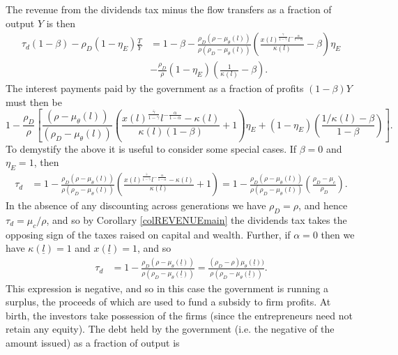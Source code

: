 \documentclass[11pt]{article}
\theoremstyle{plain}
\begin{document}
The revenue from the dividends tax minus the flow transfers as a fraction of output $Y$ is then
\begin{align*}
\tau_d(1-\beta) - \rho_D(1-\eta_E)\frac{T}{Y} & = 1 - \beta - \frac{\rho_D(\rho - \mu_{\theta}(l))}{\rho(\rho_D - \mu_{\theta}(l))}{\left( \frac{x(l)^{\frac{\overline{\gamma}}{1-\overline{\gamma}}}l^{-\frac{\alpha}{1-\alpha}}}{\kappa(l)} - \beta\right)}\eta_E
\\ & - \frac{\rho_D}{\rho}(1-\eta_E){\left(\frac{1}{\kappa(l)} - \beta \right)}.
\end{align*}
The interest payments paid by the government as a fraction of profits $(1-\beta)Y$ must then be 
\begin{equation}
1 - \frac{\rho_D}{\rho}{\left[\frac{(\rho - \mu_{\theta}(l))}{(\rho_D - \mu_{\theta}(l))}{\left( \frac{x(l)^{\frac{\overline{\gamma}}{1-\overline{\gamma}}}l^{-\frac{\alpha}{1-\alpha}}-\kappa(l)}{\kappa(l)(1-\beta)} + 1\right)} \eta_E + (1-\eta_E){\left(\frac{1/\kappa(l) - \beta}{1-\beta} \right)} \right]}.
\label{interestDY}
\end{equation}
To demystify the above it is useful to consider some special cases. If $\beta = 0$ and $\eta_E = 1$, then
\begin{align*}
\tau_d & = 1 - \frac{\rho_D(\rho - \mu_{\theta}(l))}{\rho(\rho_D - \mu_{\theta}(l))}{\left( \frac{x(l)^{\frac{\overline{\gamma}}{1-\overline{\gamma}}}l^{-\frac{\alpha}{1-\alpha}}-\kappa(l)}{\kappa(l)} + 1\right)} = 1 - \frac{\rho_D(\rho - \mu_{\theta}(l))}{\rho(\rho_D - \mu_{\theta}(l))} {\left(\frac{\rho_D - \mu_c}{\rho_D}\right)}.
\end{align*} 
In the absence of any discounting across generations we have $\rho_D = \rho$, and hence $\tau_d = \mu_c/\rho$, and so by Corollary \ref{colREVENUEmain} the dividends tax takes the opposing sign of the taxes raised on capital and wealth. Further, if $\alpha = 0$ then we have $\kappa(\underline{l}) = 1$ and $x(\underline{l}) = 1$, and so
\begin{align*}
\tau_d & = 1 - \frac{\rho_D(\rho - \mu_{\theta}(\underline{l}))}{\rho(\rho_D - \mu_{\theta}(\underline{l}))}
 = \frac{(\rho_D - \rho)\mu_{\theta}(\underline{l}))}{\rho(\rho_D - \mu_{\theta}(\underline{l}))}.
\end{align*}
This expression is negative, and so in this case the government is running a surplus, the proceeds of which are used to fund a subsidy to firm profits. At birth, the investors take possession of the firms (since the entrepreneurs need not retain any equity). The debt held by the government (i.e. the negative of the amount issued) as a fraction of output is
\end{document}
